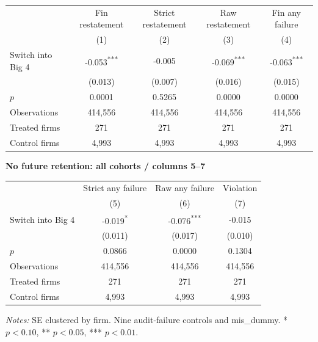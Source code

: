\documentclass[10pt]{article}
\newcommand{\sym}[1]{\textsuperscript{#1}}
\begin{document}
\begin{tabular*}{\textwidth}{@{\extracolsep{\fill}}lcccc@{}}
\toprule
 & Fin restatement & Strict restatement & Raw restatement & Fin any failure \\
 & (1) & (2) & (3) & (4) \\
\midrule
Switch into Big 4 & -0.053\sym{***} & -0.005 & -0.069\sym{***} & -0.063\sym{***} \\
 & (0.013) & (0.007) & (0.016) & (0.015) \\
$p$ & 0.0001 & 0.5265 & 0.0000 & 0.0000 \\
Observations & 414,556 & 414,556 & 414,556 & 414,556 \\
Treated firms & 271 & 271 & 271 & 271 \\
Control firms & 4,993 & 4,993 & 4,993 & 4,993 \\
\bottomrule\end{tabular*}\par
\medskip\textbf{No future retention: all cohorts / columns 5--7}\par\smallskip
\begin{tabular*}{\textwidth}{@{\extracolsep{\fill}}lccc@{}}
\toprule
 & Strict any failure & Raw any failure & Violation \\
 & (5) & (6) & (7) \\
\midrule
Switch into Big 4 & -0.019\sym{*} & -0.076\sym{***} & -0.015 \\
 & (0.011) & (0.017) & (0.010) \\
$p$ & 0.0866 & 0.0000 & 0.1304 \\
Observations & 414,556 & 414,556 & 414,556 \\
Treated firms & 271 & 271 & 271 \\
Control firms & 4,993 & 4,993 & 4,993 \\
\bottomrule\end{tabular*}\par
\medskip\fontsize{9}{11}\selectfont\textit{Notes:} SE clustered by firm. Nine audit-failure controls and mis\_dummy. * $p<0.10$, ** $p<0.05$, *** $p<0.01$.
\end{document}

